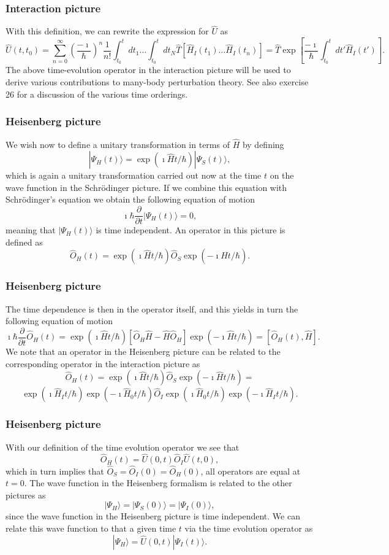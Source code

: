 \frame
{
\frametitle{Interaction picture}
\begin{small}
{\scriptsize
With this definition, we can rewrite the expression for $\hat{U}$ as 
\[
\hat{U}(t,t_0)=\sum_{n=0}^{\infty}\left(\frac{-\imath}{\hbar}\right)^n\frac{1}{n!}
\int_{t_0}^t dt_1\dots \int_{t_0}^t dt_N \hat{T}\left[\hat{H}_I(t_1)\dots\hat{H}_I(t_n)\right]=\hat{T}\exp{\left[\frac{-\imath}{\hbar}
\int_{t_0}^t dt' \hat{H}_I(t')\right]}.
\]
The above time-evolution operator in the interaction picture will be used
to derive various contributions to many-body perturbation theory. See also exercise 26 for a discussion of the various time orderings.
}
\end{small}
}
\frame
{
\frametitle{Heisenberg picture}
\begin{small}
{\scriptsize
We wish now to define a unitary transformation in terms of $\hat{H}$ by defining
\[
|\Psi_H(t)\rangle = \exp{(\imath\hat{H}t/\hbar)}|\Psi_S(t)\rangle,
\]
which is again a unitary transformation carried out now at the time $t$ on the 
wave function in the Schr\"odinger picture. If we combine this equation with 
Schr\"odinger's equation we obtain the following equation of motion
\[
\imath \hbar\frac{\partial }{\partial t}|\Psi_H(t)\rangle = 0,
\]
meaning that $|\Psi_H(t)\rangle$ is time independent. An operator in this picture is defined as
\[
\hat{O}_H(t)=
\exp{(\imath\hat{H}t/\hbar)}\hat{O}_S\exp{(-\imath\hat{H}t/\hbar)}.
\]
}
\end{small}
}
\frame
{
\frametitle{Heisenberg picture}
\begin{small}
{\scriptsize
The time dependence is then in the operator itself, and this yields in turn the
following equation of motion
\[
\imath \hbar\frac{\partial }{\partial t}\hat{O}_H(t) = \exp{(\imath\hat{H}t/\hbar)}\left[\hat{O}_H\hat{H}-\hat{H}\hat{O}_H\right]\exp{(-\imath\hat{H}t/\hbar)}=\left[\hat{O}_H(t),\hat{H}\right].
\]
We note that an operator in the Heisenberg picture can be related to the corresponding
operator in the interaction picture as 
\[
\hat{O}_H(t)=
\exp{(\imath\hat{H}t/\hbar)}\hat{O}_S\exp{(-\imath\hat{H}t/\hbar)}=\]
\[
\exp{(\imath\hat{H}_It/\hbar)}\exp{(-\imath\hat{H}_0t/\hbar)}\hat{O}_I\exp{(\imath\hat{H}_0t/\hbar)}\exp{(-\imath\hat{H}_It/\hbar)}.
\]
}
\end{small}
}
\frame
{
\frametitle{Heisenberg picture}
\begin{small}
{\scriptsize
With our definition of the time evolution operator we see that
\[
\hat{O}_H(t)=\hat{U}(0,t)\hat{O}_I\hat{U}(t,0),
\]
which in turn implies that $\hat{O}_S=\hat{O}_I(0)=\hat{O}_H(0)$, all operators are equal at $t=0$. The wave function in the Heisenberg formalism is 
related to the other pictures as 
\[
|\Psi_H\rangle=|\Psi_S(0)\rangle=|\Psi_I(0)\rangle,
\]
since the wave function in the Heisenberg picture is time independent. 
We can relate this wave function to that a given time $t$ via the time evolution operator as
\[
|\Psi_H\rangle=\hat{U}(0,t)|\Psi_I(t)\rangle.
\]
}
\end{small}
}

